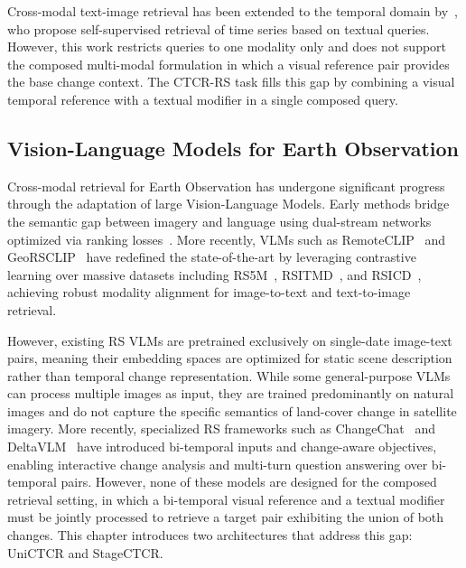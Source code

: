 Cross-modal text-image retrieval has been extended to the
temporal domain by~\cite{hoxha2025selfsupervised},
who propose self-supervised retrieval of time series based
on textual queries. However, this work restricts queries
to one modality only and does not support the composed multi-modal
formulation in which a visual reference pair provides the
base change context. The CTCR-RS task fills this gap by
combining a visual temporal reference with a textual
modifier in a single composed query.
 
\subsection{Vision-Language Models for Earth Observation}
\label{sec:chap7_rw_vlm}
 
Cross-modal retrieval for Earth Observation has undergone
significant progress through the adaptation of large
Vision-Language Models. Early methods bridge the semantic
gap between imagery and language using dual-stream networks
optimized via ranking losses~\cite{cheng2021deep,
yuan2022exploring}. More recently, VLMs such as
RemoteCLIP~\cite{liu2024remoteclip} and
GeoRSCLIP~\cite{zhang2024rs5m} have redefined the
state-of-the-art by leveraging contrastive learning over
massive datasets including RS5M~\cite{zhang2024rs5m},
RSITMD~\cite{RSITMD}, and RSICD~\cite{lu2017exploring}, achieving
robust modality alignment for image-to-text and
text-to-image retrieval.
 

However, existing RS VLMs are pretrained exclusively on
single-date image-text pairs, meaning their embedding spaces
are optimized for static scene description rather than
temporal change representation. While some general-purpose
VLMs can process multiple images as input, they are trained
predominantly on natural images and do not capture the
specific semantics of land-cover change in satellite
imagery. More recently, specialized RS frameworks such as
ChangeChat~\cite{deng2025changechat} and
DeltaVLM~\cite{deng2026deltavlm} have introduced
bi-temporal inputs and change-aware objectives, enabling
interactive change analysis and multi-turn question
answering over bi-temporal pairs. However, none of these
models are designed for the composed retrieval setting, in
which a bi-temporal visual reference and a textual modifier
must be jointly processed to retrieve a target pair
exhibiting the union of both changes. This chapter
introduces two architectures that address this gap:
UniCTCR and StageCTCR.


